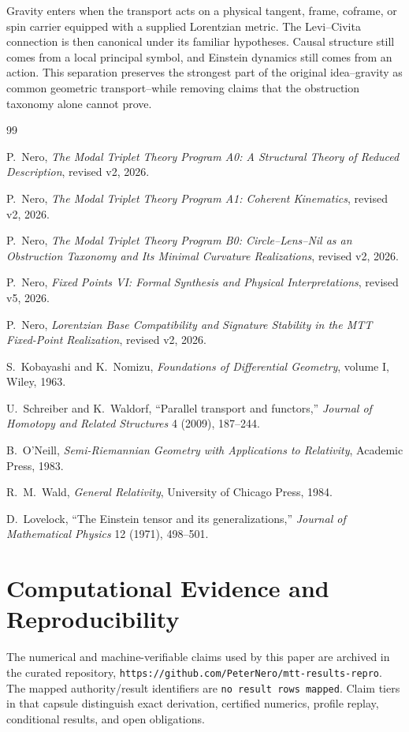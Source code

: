 \documentclass[11pt]{article}
\begin{document}
Gravity enters when the transport acts on a physical tangent, frame, coframe,
or spin carrier equipped with a supplied Lorentzian metric.  The
Levi--Civita connection is then canonical under its familiar hypotheses.
Causal structure still comes from a local principal symbol, and Einstein
dynamics still comes from an action.  This separation preserves the strongest
part of the original idea--gravity as common geometric transport--while
removing claims that the obstruction taxonomy alone cannot prove.

\begin{thebibliography}{99}

P.~Nero,
\newblock \emph{The Modal Triplet Theory Program A0: A Structural Theory of
Reduced Description}, revised v2, 2026.

P.~Nero,
\newblock \emph{The Modal Triplet Theory Program A1: Coherent Kinematics},
revised v2, 2026.

P.~Nero,
\newblock \emph{The Modal Triplet Theory Program B0: Circle--Lens--Nil as an
Obstruction Taxonomy and Its Minimal Curvature Realizations},
revised v2, 2026.

P.~Nero,
\newblock \emph{Fixed Points VI: Formal Synthesis and Physical
Interpretations}, revised v5, 2026.

P.~Nero,
\newblock \emph{Lorentzian Base Compatibility and Signature Stability in the
MTT Fixed-Point Realization}, revised v2, 2026.

S.~Kobayashi and K.~Nomizu,
\newblock \emph{Foundations of Differential Geometry}, volume I,
Wiley, 1963.

U.~Schreiber and K.~Waldorf,
\newblock ``Parallel transport and functors,''
\emph{Journal of Homotopy and Related Structures} 4 (2009), 187--244.

B.~O'Neill,
\newblock \emph{Semi-Riemannian Geometry with Applications to Relativity},
Academic Press, 1983.

R.~M.~Wald,
\newblock \emph{General Relativity},
University of Chicago Press, 1984.

D.~Lovelock,
\newblock ``The Einstein tensor and its generalizations,''
\emph{Journal of Mathematical Physics} 12 (1971), 498--501.

\end{thebibliography}

\section*{Computational Evidence and Reproducibility}
The numerical and machine-verifiable claims used by this paper are archived in the curated repository, \texttt{https://github.com/PeterNero/mtt-results-repro}. The mapped authority/result identifiers are \texttt{no result rows mapped}. Claim tiers in that capsule distinguish exact derivation, certified numerics, profile replay, conditional results, and open obligations.
\end{document}
